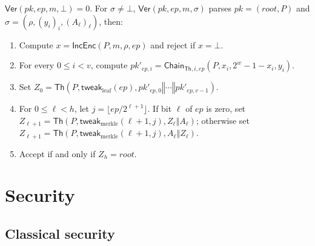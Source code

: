 \documentclass[11pt]{article}
\theoremstyle{definition}
\theoremstyle{plain}
\theoremstyle{remark}
\newcommand{\Th}{\mathsf{Th}}
\newcommand{\IncEnc}{\mathsf{IncEnc}}
\newcommand{\Ver}{\mathsf{Ver}}
\newcommand{\Chain}{\mathsf{Chain}}
\newcommand{\concat}{\mathbin\Vert}
\newcommand{\ep}{\mathit{ep}}
\newcommand{\pk}{\mathit{pk}}
\newcommand{\rootnode}{\mathit{root}}
\begin{document}
$\Ver(\pk,\ep,m,\bot)=0$. For $\sigma\neq\bot$, $\Ver(\pk,\ep,m,\sigma)$ parses $\pk=(\rootnode,P)$ and $\sigma=(\rho,(y_i)_i,(A_\ell)_\ell)$, then:
\begin{enumerate}[leftmargin=2em]
\item Compute $x=\IncEnc(P,m,\rho,\ep)$ and reject if $x=\bot$.
\item For every $0\leq i<v$, compute $\mathit{pk}'_{\ep,i}=\Chain_{\Th,i,\ep}(P,x_i,2^w-1-x_i,y_i)$.
\item Set $Z_0=\Th(P,\mathsf{tweak}_{\mathrm{leaf}}(\ep),\mathit{pk}'_{\ep,0}\concat\cdots\concat\mathit{pk}'_{\ep,v-1})$.
\item For $0\leq\ell<h$, let $j=\lfloor\ep/2^{\ell+1}\rfloor$. If bit $\ell$ of $\ep$ is zero, set $Z_{\ell+1}=\Th(P,\mathsf{tweak}_{\mathrm{merkle}}(\ell+1,j),Z_\ell\concat A_\ell)$; otherwise set $Z_{\ell+1}=\Th(P,\mathsf{tweak}_{\mathrm{merkle}}(\ell+1,j),A_\ell\concat Z_\ell)$.
\item Accept if and only if $Z_h=\rootnode$.
\end{enumerate}

\section{Security}
\label{sec:security}

\subsection{Classical security}
\end{document}
